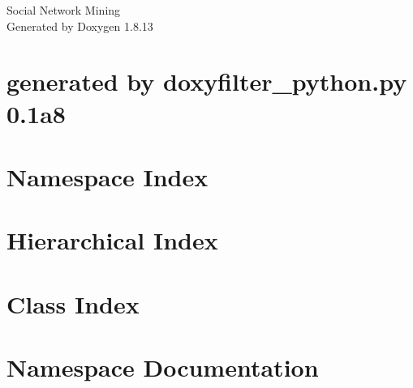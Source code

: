 \documentclass[twoside]{book}
\newcommand{\+}{\discretionary{\mbox{\scriptsize$\hookleftarrow$}}{}{}}
\newcommand{\clearemptydoublepage}{%
  \newpage{\pagestyle{empty}\cleardoublepage}%
}
\begin{document}
\hypersetup{pageanchor=false,
             bookmarksnumbered=true,
             pdfencoding=unicode
            }
\begin{titlepage}
\vspace*{7cm}
\begin{center}%
{\Large Social Network Mining }\\
\vspace*{1cm}
{\large Generated by Doxygen 1.8.13}\\
\end{center}
\end{titlepage}
\clearemptydoublepage
{}
\tableofcontents
\clearemptydoublepage
{}
\hypersetup{pageanchor=true}

\chapter{generated by doxyfilter\+\_\+python.\+py 0.1a8}
\label{md_wrappers_README}

\chapter{Namespace Index}

\chapter{Hierarchical Index}

\chapter{Class Index}

\chapter{Namespace Documentation}



\end{document}
